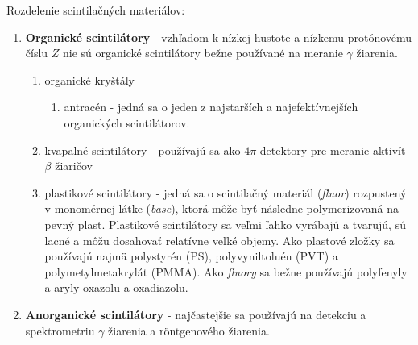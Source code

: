 \documentclass[../../main.tex]{subfiles}
\begin{document}
Rozdelenie scintilačných materiálov:
\begin{enumerate}
\item \textbf{Organické scintilátory} - vzhľadom k nízkej hustote a nízkemu protónovému číslu $Z$ nie sú organické scintilátory bežne používané na meranie $\gamma$ žiarenia.
\begin{enumerate}
\item organické kryštály
\begin{enumerate}
\item antracén - jedná sa o jeden z najstarších a najefektívnejších organických scintilátorov.
\end{enumerate}
\item kvapalné scintilátory - používajú sa ako $4\pi$ detektory pre meranie aktivít $\beta$ žiaričov
\item plastikové scintilátory - jedná sa o scintilačný materiál (\textit{fluor}) rozpustený v monomérnej látke (\textit{base}), ktorá môže byť následne polymerizovaná na pevný plast. Plastikové scintilátory sa veľmi ľahko vyrábajú a tvarujú, sú lacné a môžu dosahovať relatívne veľké objemy. Ako plastové zložky sa používajú najmä polystyrén (PS), polyvyniltoluén (PVT) a polymetylmetakrylát (PMMA). Ako \textit{fluory} sa bežne používajú polyfenyly a aryly oxazolu a oxadiazolu.
\end{enumerate}

\item \textbf{Anorganické scintilátory} - najčastejšie sa používajú na detekciu a spektrometriu $\gamma$ žiarenia a r\"{o}ntgenového žiarenia. 


\end{enumerate}
\end{document}
